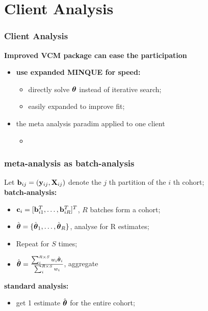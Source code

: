 \documentclass{beamer}
\begin{document}
\section{Client Analysis}
\begin{frame}\frametitle{Client Analysis}
  \textbf{Improved VCM package can ease the participation} \\
  \begin{itemize}
  \item \textbf{use expanded MINQUE for speed:}
    \begin{itemize}
    \item directly solve $\boldsymbol{\theta}$ instead of iterative search;
    \item easily expanded to improve fit;
    \end{itemize}
  \item the meta analysis paradim applied to one client
    \begin{itemize}
    \item 
    \end{itemize}
  \end{itemize}
\end{frame}
\begin{frame}\frametitle{meta-analysis as batch-analysis}
  Let $\mathbf{b}_{ij}=(\mathbf{y}_{ij}, \mathbf{X}_{ij})$ denote the $j$ th partition of the $i$ th cohort; \\
  \textbf{batch-analysis:}
  \begin{itemize}
  \item $\mathbf{c}_i = [\mathbf{b}_{i1}^T, \dots, \mathbf{b}_{iR}^T ]^T$, $R$ batches form a cohort;
  \item $\hat{\boldsymbol{\theta}}=\{\hat{\boldsymbol{\theta}}_1, \dots, \hat{\boldsymbol{\theta}}_R\}$, analyse for R estimates;
  \item Repeat for $S$ times;
  \item $\hat{\boldsymbol{\theta}} = \frac{\sum_i^{R \times S} w_i \hat{\boldsymbol{\theta}}_i}{\sum_i^{R \times S} w_i}$, aggregate
  \end{itemize}
  \textbf{standard analysis:}
  \begin{itemize}
  \item get 1 estimate $\hat{\boldsymbol{\theta}}$ for the entire cohort;
  \end{itemize}
\end{frame}
\end{document}
